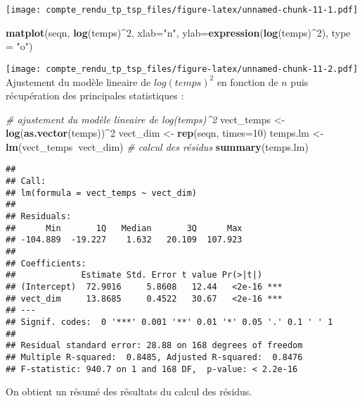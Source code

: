 \documentclass[
]{article}
\newenvironment{Shaded}{\begin{snugshade}}{\end{snugshade}}
\newcommand{\CommentTok}[1]{\textcolor[rgb]{0.56,0.35,0.01}{\textit{#1}}}
\newcommand{\DataTypeTok}[1]{\textcolor[rgb]{0.13,0.29,0.53}{#1}}
\newcommand{\DecValTok}[1]{\textcolor[rgb]{0.00,0.00,0.81}{#1}}
\newcommand{\KeywordTok}[1]{\textcolor[rgb]{0.13,0.29,0.53}{\textbf{#1}}}
\newcommand{\NormalTok}[1]{#1}
\newcommand{\OperatorTok}[1]{\textcolor[rgb]{0.81,0.36,0.00}{\textbf{#1}}}
\newcommand{\StringTok}[1]{\textcolor[rgb]{0.31,0.60,0.02}{#1}}
\begin{document}
\texttt{[image: compte\_rendu\_tp\_tsp\_files/figure-latex/unnamed-chunk-11-1.pdf]}

\begin{Shaded}
\begin{Highlighting}[]
\KeywordTok{matplot}\NormalTok{(seqn, }\KeywordTok{log}\NormalTok{(temps)}\OperatorTok{^}\DecValTok{2}\NormalTok{, }\DataTypeTok{xlab=}\StringTok{"n"}\NormalTok{, }\DataTypeTok{ylab=}\KeywordTok{expression}\NormalTok{(}\KeywordTok{log}\NormalTok{(temps)}\OperatorTok{^}\DecValTok{2}\NormalTok{), }\DataTypeTok{type =} \StringTok{"o"}\NormalTok{)}
\end{Highlighting}
\end{Shaded}

\texttt{[image: compte\_rendu\_tp\_tsp\_files/figure-latex/unnamed-chunk-11-2.pdf]}
Ajustement du modèle lineaire de \(log(temps)^2\) en fonction de \(n\)
puis récupération des principales statistiques :

\begin{Shaded}
\begin{Highlighting}[]
\CommentTok{# ajustement du modèle lineaire de log(temps)^2}
\NormalTok{vect_temps <-}\StringTok{ }\KeywordTok{log}\NormalTok{(}\KeywordTok{as.vector}\NormalTok{(temps))}\OperatorTok{^}\DecValTok{2}
\NormalTok{vect_dim <-}\StringTok{ }\KeywordTok{rep}\NormalTok{(seqn, }\DataTypeTok{times=}\DecValTok{10}\NormalTok{)}
\NormalTok{temps.lm <-}\StringTok{ }\KeywordTok{lm}\NormalTok{(vect_temps}\OperatorTok{~}\NormalTok{vect_dim) }\CommentTok{# calcul des résidus}
\KeywordTok{summary}\NormalTok{(temps.lm)}
\end{Highlighting}
\end{Shaded}

\begin{verbatim}
## 
## Call:
## lm(formula = vect_temps ~ vect_dim)
## 
## Residuals:
##      Min       1Q   Median       3Q      Max 
## -104.889  -19.227    1.632   20.109  107.923 
## 
## Coefficients:
##             Estimate Std. Error t value Pr(>|t|)    
## (Intercept)  72.9016     5.8608   12.44   <2e-16 ***
## vect_dim     13.8685     0.4522   30.67   <2e-16 ***
## ---
## Signif. codes:  0 '***' 0.001 '**' 0.01 '*' 0.05 '.' 0.1 ' ' 1
## 
## Residual standard error: 28.88 on 168 degrees of freedom
## Multiple R-squared:  0.8485, Adjusted R-squared:  0.8476 
## F-statistic: 940.7 on 1 and 168 DF,  p-value: < 2.2e-16
\end{verbatim}

On obtient un résumé des résultats du calcul des résidus.
\end{document}
